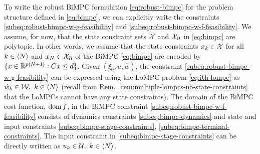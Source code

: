 To write the robust BiMPC formulation \eqref{eq:robust-bimpc} for the problem structure defined in \eqref{eq:bimpc}, we can explicitly write the constraints \eqref{subeq:robust-bimpc-w-g-feasibility} and \eqref{subeq:robust-bimpc-w-f-feasibility}.
We assume, for now, that the state constraint sets $\mathcal{X}$ and $\mathcal{X}_\Omega$ in \eqref{eq:bimpc} are polytopic.
In other words, we assume that the state constraints $x_k \in \mathcal{X}$ for all $k \in \langle N \rangle$ and $x_N \in \mathcal{X}_\Omega$ of the BiMPC \eqref{eq:bimpc} are encoded by $\{x \in \mathbb{R}^{p(N+1)}: C x \leq d\}$.
%
Given $(\xi_0, u, \hat{w})$, the constraint \eqref{subeq:robust-bimpc-w-g-feasibility} can be expressed using the LoMPC problem \eqref{eq:ith-lompc} as $\hat{w}_k \in \mathcal{W}, \ k \in \langle N \rangle$ (recall from Rem.~\ref{rem:multiple-lompcs-no-state-constraints} that the LoMPCs cannot have any state constraints).
%
The domain of the BiMPC cost function, $\operatorname{dom}{f}$, in the BiMPC constraint \eqref{subeq:robust-bimpc-w-f-feasibility} consists of dynamics constraints \eqref{subeq:bimpc-dynamics} and state and input constraints \eqref{subeq:bimpc-stage-constraints}, \eqref{subeq:bimpc-terminal-constraints}.
The input constraint in \eqref{subeq:bimpc-stage-constraints} can be directly written as $u_k \in \mathcal{U}, \ k \in \langle N \rangle$.

